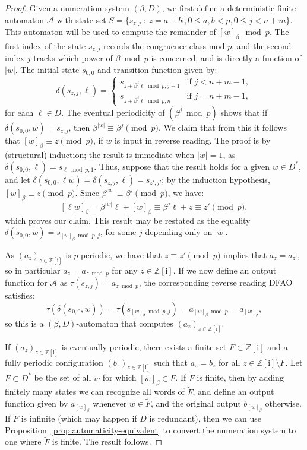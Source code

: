 \documentclass{amsart}
\newcommand{\Z}{\mathbb{Z}}
\newcommand{\ii}{\mathrm{i}}
\newtheorem*{main theorem}{Theorem \ref{thm:main-gaussian}}
\theoremstyle{definition}
\begin{document}
\begin{proof}
Given a numeration system $(\beta , D)$, we first define a deterministic finite automaton $\mathcal A$ with state set $S=\{s_{z,j}\::\: z=a+b\ii, 0\le a,b < p, 0\le j < n+m\}$. 
This automaton will be used to compute the remainder of $[w]_\beta \mod p$. The  first index of the state $s_{z,j}$ records the congruence class mod $p$, and the
 second index $j$ tracks which power of $\beta \bmod p$ is concerned, and is directly a function of $|w|$.
The  initial state $s_{0,0}$ and transition function given by:
    \[\delta(s_{z,j},\ell) = \begin{cases}
        s_{z+\beta^j\ell\bmod p,j+1} & \text{if }j<n+m-1, \\
        s_{z+\beta^j\ell\bmod p,n} & \text{if }j=n+m-1,
    \end{cases}\]
    for each $\ell \in D$.
The eventual periodicity of $(\beta^j\bmod{p})$ shows that if $\delta(s_{0,0},w)=s_{z,j}$, then $\beta^{\lvert w\rvert}\equiv\beta^j\pmod{p}$. We claim that from this it follows that $[w]_\beta\equiv z\pmod{p}$, if $w$ is input in reverse reading. The proof is by (structural) induction; the result is immediate when $\lvert w\rvert=1$, as $\delta(s_{0,0},\ell)=s_{\ell\bmod p,1}$. Thus, suppose that the result holds for a given $w\in D^*$, and let $\delta(s_{0,0},\ell w) = \delta(s_{z,j},\ell)=s_{z',j'}$; by the induction hypothesis, $[w]_\beta\equiv z\pmod{p}$. Since $\beta^{\lvert w\rvert}\equiv \beta^j\pmod{p}$, we have:
    \[ [\ell w]_\beta = \beta^{\lvert w\rvert}\ell +[w]_\beta \equiv \beta^j\ell + z \equiv z' \pmod{p}, \]
which proves our claim. This result may be restated as the equality $\delta(s_{0,0},w)=s_{[w]_\beta\bmod{p},j}$, for some $j$ depending only on $\lvert w\rvert$.

As $(a_z)_{z\in\Z[\ii]}$ is $p$-periodic, we have that $z\equiv z'\pmod{p}$ implies that $a_z=a_{z'}$, so in particular $a_z=a_{z\bmod p}$ for any $z\in\Z[\ii]$. If we now define an output function for $\mathcal A$ as $\tau(s_{z,j}) = a_{z\bmod p}$, the corresponding reverse reading DFAO satisfies:
\[\tau(\delta(s_{0,0},w))=\tau(s_{[w]_\beta\bmod p,j})=a_{[w]_\beta \bmod p}=a_{[w]_\beta}, \]
so this is a $(\beta , D)$-automaton that computes $(a_z)_{z\in\Z[\ii]}$.

If $(a_z)_{z\in\Z[\ii]}$ is eventually periodic, there exists a finite set $F\subset\Z[\ii]$ and a fully periodic configuration $(b_z)_{z\in\Z[\ii]}$ such that $a_z=b_z$ for all $z\in\Z[\ii]\setminus F$. Let $\tilde{F}\subset D^*$ be the set of all $w$ for which $[w]_\beta\in F$. If $\tilde{F}$ is finite, then  by   adding finitely many states we can recognize all words of $\tilde{F}$, and define an output  function given by $a_{[w]_\beta}$ whenever $w\in\tilde{F}$, and the original output $b_{[w]_\beta}$ otherwise. If $\tilde{F}$ is infinite (which may happen if $D$ is redundant), then we can use Proposition~\ref{prop:automaticity-equivalent} to convert the numeration system to one where $\tilde{F}$ is finite. The result follows. 


\end{proof}
\end{document}
